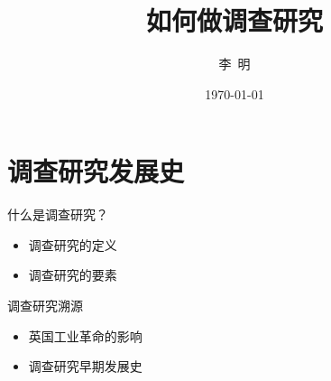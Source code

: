 \documentclass{beamer}
\title{如何做调查研究}
\date{\today}
\author{李\ 明}
\institute{南京大学新闻传播学院}
\begin{document}
  \maketitle
  
\section{调查研究发展史}
  \begin{frame}{什么是调查研究？}
    \begin{itemize}
    	\item 调查研究的定义
    	\item 调查研究的要素
    \end{itemize}
  \end{frame}

\begin{frame}{调查研究溯源}
    \begin{itemize}
    	\item 英国工业革命的影响
    	\item 调查研究早期发展史
    \end{itemize}
  \end{frame}


 
\end{document}
